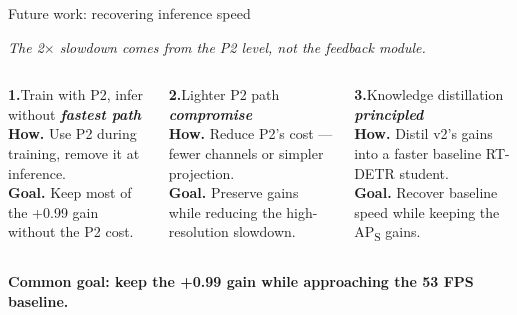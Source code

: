 \documentclass[aspectratio=169,11pt]{beamer}
\begin{document}
\begin{frame}{Future work: recovering inference speed}
    \begin{center}
    \emph{The 2$\times$ slowdown comes from the P2 level, not the feedback module.}
    \end{center}
    \vspace{0.5em}

    \begin{columns}[T, onlytextwidth]
        \begin{block}{\textbf{1.}\hspace{0.5em}Train with P2, infer without}
            {\color{Navy}\small\itshape\textbf{fastest path}}\\[0.6em]
            \textbf{How.} Use P2 during training, remove it at inference.\\[0.6em]
            \textbf{\color{GoodGreen}Goal.} Keep most of the +0.99 gain without the P2 cost.
        \end{block}

        \begin{block}{\textbf{2.}\hspace{0.5em}Lighter P2 path}
            {\color{Navy}\small\itshape\textbf{compromise}}\\[0.6em]
            \textbf{How.} Reduce P2's cost — fewer channels or simpler projection.\\[0.6em]
            \textbf{\color{GoodGreen}Goal.} Preserve gains while reducing the high-resolution slowdown.
        \end{block}

        \begin{block}{\textbf{3.}\hspace{0.5em}Knowledge distillation}
            {\color{Navy}\small\itshape\textbf{principled}}\\[0.6em]
            \textbf{How.} Distil v2's gains into a faster baseline RT-DETR student.\\[0.6em]
            \textbf{\color{GoodGreen}Goal.} Recover baseline speed while keeping the AP\textsubscript{S} gains.
        \end{block}
    \end{columns}

    \vspace{0.4em}
    \begin{center}
    {\bfseries\color{Navy}\footnotesize
    Common goal: keep the +0.99 gain while approaching the 53 FPS baseline.}
    \end{center}
\end{frame}
\end{document}
